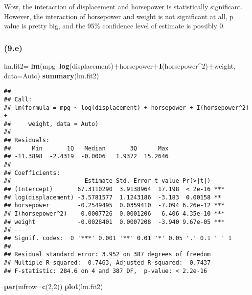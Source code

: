 \documentclass[]{article}
\newenvironment{Shaded}{\begin{snugshade}}{\end{snugshade}}
\newcommand{\DataTypeTok}[1]{\textcolor[rgb]{0.13,0.29,0.53}{#1}}
\newcommand{\DecValTok}[1]{\textcolor[rgb]{0.00,0.00,0.81}{#1}}
\newcommand{\KeywordTok}[1]{\textcolor[rgb]{0.13,0.29,0.53}{\textbf{#1}}}
\newcommand{\NormalTok}[1]{#1}
\newcommand{\OperatorTok}[1]{\textcolor[rgb]{0.81,0.36,0.00}{\textbf{#1}}}
\newcommand{\StringTok}[1]{\textcolor[rgb]{0.31,0.60,0.02}{#1}}
\begin{document}
Wow, the interaction of displacement and horsepower is statistically
significant. However, the interaction of horsepower and weight is not
significant at all, p value is pretty big, and the 95\% confidence level
of estimate is possibly 0.

\hypertarget{e-1}{%
\subsubsection{(9.e)}\label{e-1}}

\begin{Shaded}
\begin{Highlighting}[]
\NormalTok{lm.fit2=}\StringTok{ }\KeywordTok{lm}\NormalTok{(mpg}\OperatorTok{~}\KeywordTok{log}\NormalTok{(displacement)}\OperatorTok{+}\NormalTok{horsepower}\OperatorTok{+}\KeywordTok{I}\NormalTok{(horsepower}\OperatorTok{^}\DecValTok{2}\NormalTok{)}\OperatorTok{+}\NormalTok{weight, }\DataTypeTok{data=}\NormalTok{Auto)}
\KeywordTok{summary}\NormalTok{(lm.fit2)}
\end{Highlighting}
\end{Shaded}

\begin{verbatim}
## 
## Call:
## lm(formula = mpg ~ log(displacement) + horsepower + I(horsepower^2) + 
##     weight, data = Auto)
## 
## Residuals:
##      Min       1Q   Median       3Q      Max 
## -11.3898  -2.4319  -0.0006   1.9372  15.2646 
## 
## Coefficients:
##                     Estimate Std. Error t value Pr(>|t|)    
## (Intercept)       67.3110290  3.9138964  17.198  < 2e-16 ***
## log(displacement) -3.5781577  1.1243186  -3.183  0.00158 ** 
## horsepower        -0.2549495  0.0359410  -7.094 6.26e-12 ***
## I(horsepower^2)    0.0007726  0.0001206   6.406 4.35e-10 ***
## weight            -0.0028401  0.0007208  -3.940 9.67e-05 ***
## ---
## Signif. codes:  0 '***' 0.001 '**' 0.01 '*' 0.05 '.' 0.1 ' ' 1
## 
## Residual standard error: 3.952 on 387 degrees of freedom
## Multiple R-squared:  0.7463, Adjusted R-squared:  0.7437 
## F-statistic: 284.6 on 4 and 387 DF,  p-value: < 2.2e-16
\end{verbatim}

\begin{Shaded}
\begin{Highlighting}[]
\KeywordTok{par}\NormalTok{(}\DataTypeTok{mfrow=}\KeywordTok{c}\NormalTok{(}\DecValTok{2}\NormalTok{,}\DecValTok{2}\NormalTok{))}
\KeywordTok{plot}\NormalTok{(lm.fit2)}
\end{Highlighting}
\end{Shaded}
\end{document}
